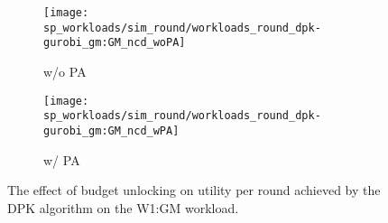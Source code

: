 \documentclass[conference,compsoc]{IEEEtran}
\begin{document}
\begin{figure}[ht]
    \centering
    \begin{subfigure}[b]{1.0\columnwidth}
        \texttt{[image: sp\_workloads/sim\_round/workloads\_round\_dpk-gurobi\_gm:GM\_ncd\_woPA]}

        \caption{w/o PA}
        \vspace{-3pt}
    \end{subfigure}

    \vspace{10pt}
    \begin{subfigure}[b]{1.0\columnwidth}
        \texttt{[image: sp\_workloads/sim\_round/workloads\_round\_dpk-gurobi\_gm:GM\_ncd\_wPA]}

        \caption{w/ PA}
    \end{subfigure}

    \caption{The effect of budget unlocking on utility per round achieved by the DPK algorithm on the W1:GM workload.}

\end{figure}
\end{document}
